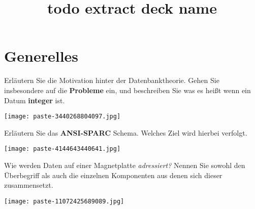 \documentclass{article}
\title{todo extract deck name}
\begin{document}
\section{Generelles}
\begin{tcolorbox}[colback=white!10!white,colframe=lightgray!75!black,
  savelowerto=\jobname_ex.tex]

\begin{center}
 Erläutern Sie die Motivation hinter der Datenbanktheorie. Gehen Sie insbesondere auf die 
\textbf{Probleme
} ein, und beschreiben Sie was es heißt wenn ein Datum 
\textbf{integer
}ist. 

\end{center}

\tcblower

\justifying
\texttt{[image: paste-3440268804097.jpg]}

\end{tcolorbox}
\begin{tcolorbox}[colback=white!10!white,colframe=lightgray!75!black,
  savelowerto=\jobname_ex.tex]

\begin{center}
 Erläutern Sie das 
\textbf{ANSI-SPARC
}Schema. Welches Ziel wird hierbei verfolgt. 

\end{center}

\tcblower

\justifying
\texttt{[image: paste-4144643440641.jpg]}

\end{tcolorbox}
\begin{tcolorbox}[colback=white!10!white,colframe=lightgray!75!black,
  savelowerto=\jobname_ex.tex]

\begin{center}
 Wie werden Daten auf einer Magnetplatte 
\textit{adressiert?
}Nennen Sie sowohl den Überbegriff als auch die einzelnen Komponenten aus denen sich dieser zusammensetzt. 

\end{center}

\tcblower

\justifying
\texttt{[image: paste-11072425689089.jpg]}

\end{tcolorbox}
\end{document}
